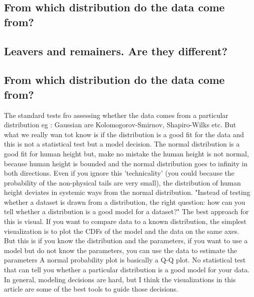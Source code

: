 \documentclass[11pt]{article}
\theoremstyle{definition}
\theoremstyle{remark}
\begin{document}
\subsection{From which distribution do the data come from?}
\label{sse:res}

\subsection{Leavers and remainers.  Are they different?}
\label{sse:leaversremainers}

\subsection{From which distribution do the data come from?}
\label{sse:leaversremainers}
The standard tests fro assessing whether the data comes from a particular distribution eg : Gaussian are Kolomogorov-Smirnov, Shapiro-Wilks etc. But what we really wan tot know is if the distribution is a good fit for the data and this is not a statistical test but a model decision.
The normal distribution is a good fit for human height but, make no mistake the human height is not normal, because human height is bounded and the normal distribution goes to infinity in both directions.
Even if you ignore this 'technicality' (you could because the probability of the non-physical tails are very small), the distribution of human height deviates in systemic ways from the normal distribution.
"Instead of testing whether a dataset is drawn from a distribution, the right question: how can you tell whether a distribution is a good model for a dataset?" The best approach for this is visual.
If you want to compare data to a known distribution, the simplest visualization is to plot the CDFs of the model and the data on the same axes. But this is if you know the distribution and the parameters, if you want to use a model but do not know the parameters, you can use the data to estimate the parameters
A normal probability plot is basically a Q-Q plot. No statistical test that can tell you whether a particular distribution is a good model for your data.  In general, modeling decisions are hard, but I think the visualizations in this article are some of the best tools to guide those decisions.
\end{document}
